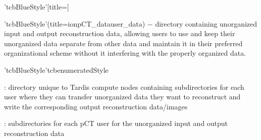 \begin{tcbenvironment}'tcbBlueStyle'[title=]
\begin{tcbparagraph}'tcbBlueStyle'(title=\dirsep ion\dirsep pCT\_data\dirsep user\_data)%
$\boldsymbol{-}$ directory containing unorganized input and output reconstruction data, allowing users to use and keep their unorganized data separate from other data and maintain it in their preferred organizational scheme without it interfering with the properly organized data.
\end{tcbparagraph}
\begin{tcbparagraph}'tcbBlueStyle'{tcbenumeratedStyle}
\begin{ThinEnum}[labelindent=1pt, leftmargin=*]
    \item {} : directory unique to Tardis compute nodes containing subdirectories for each user where they can transfer unorganized data they want to reconstruct and write the corresponding output reconstruction data/images
    \begin{ThinEnum}[labelindent=1pt, leftmargin=*]
		\item {} : subdirectories for each pCT user for the unorganized input and output reconstruction data
	\end{ThinEnum}
\end{ThinEnum}
\end{tcbparagraph}
\end{tcbenvironment}
\endinput
